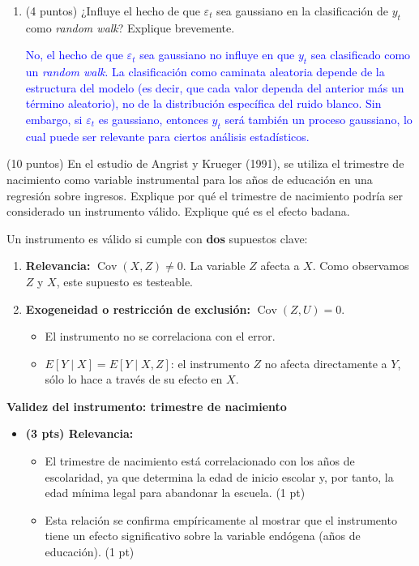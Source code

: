 \documentclass[10pt,a4paper]{article}
\begin{document}
\begin{enumerate}
{{{{\begin{enumerate}
    \textcolor{blue}{
        La varianza del proceso crece indefinidamente, por tanto, no cumple la condición de varianza constante requerida para la estacionariedad.
        }
    \item[(c)]  (4 puntos) ¿Influye el hecho de que \( \varepsilon_t \) sea gaussiano en la clasificación de \( y_t \) como \textit{random walk}? Explique brevemente.

     \textcolor{blue}{
        No, el hecho de que \( \varepsilon_t \) sea gaussiano no influye en que \( y_t \) sea clasificado como un \textit{random walk}. La clasificación como caminata aleatoria depende de la estructura del modelo (es decir, que cada valor dependa del anterior más un término aleatorio), no de la distribución específica del ruido blanco. Sin embargo, si \( \varepsilon_t \) es gaussiano, entonces \( y_t \) será también un proceso gaussiano, lo cual puede ser relevante para ciertos análisis estadísticos.
        }
\end{enumerate}

\item (10 puntos)
En el estudio de Angrist y Krueger (1991), se utiliza el trimestre de nacimiento como variable instrumental para los años de educación en una regresión sobre ingresos. 
 Explique por qué el trimestre de nacimiento podría ser considerado un instrumento válido. 
    Explique qué es el efecto badana.

{\color{blue}  Un instrumento es v\'alido si cumple con \textbf{dos} supuestos clave:
    \begin{enumerate}
        \item {\color{blue}\textbf{Relevancia:} }$\operatorname{Cov}(X, Z) \neq 0$. La variable $Z$ afecta a $X$. Como observamos $Z$ y $X$, este supuesto es testeable.
        \item  {\color{blue}\textbf{Exogeneidad o restricci\'on de exclusi\'on:}} $\operatorname{Cov}(Z, U)=0$. 
        \begin{itemize}
            \item El instrumento no se correlaciona con el error.
            \item $E[Y \mid X]=E[Y \mid X, Z]$: el instrumento $Z$ no afecta directamente a $Y$, s\'olo lo hace a trav\'es de su efecto en $X$.
        \end{itemize}
    \end{enumerate}
 \textbf{ Validez del instrumento: trimestre de nacimiento}
    \begin{itemize}
        \item \textbf{(3 pts) Relevancia:}
        \begin{itemize}
            \item El trimestre de nacimiento está correlacionado con los años de escolaridad, ya que determina la edad de inicio escolar y, por tanto, la edad mínima legal para abandonar la escuela. \hfill (1 pt)
            \item Esta relación se confirma empíricamente al mostrar que el instrumento tiene un efecto significativo sobre la variable endógena (años de educación). \hfill (1 pt)
        \end{itemize}
        

\end{itemize}}}}}}
\end{enumerate}
\end{document}
